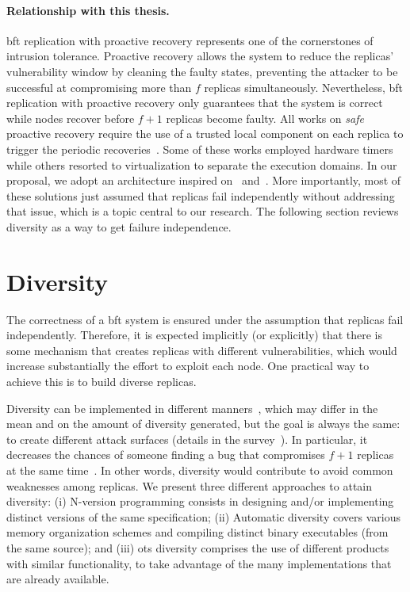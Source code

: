 \paragraph{Relationship with this thesis.} 
\gls{bft} replication with proactive recovery represents one of the cornerstones of intrusion tolerance. 
Proactive recovery allows the system to reduce the replicas' vulnerability window by cleaning the faulty states, preventing the attacker to be successful at compromising more than $f$ replicas simultaneously. 
Nevertheless, \gls{bft} replication with proactive recovery only guarantees that the system is correct while nodes recover before $f+1$ replicas become faulty. 
All works on \emph{safe} proactive recovery require the use of a trusted local component on each replica to trigger the periodic recoveries~\cite{Castro:2002,Sousa:2010,Roeder:2010,Platania:2014,Distler:2011}.
Some of these works employed hardware timers while others resorted to virtualization to separate the execution domains. 
In our proposal, we adopt an architecture inspired on~\cite{Distler:2008} and~\cite{Sousa:2010}. 
More importantly, most of these solutions just assumed that replicas fail independently without addressing that issue, which is a topic central to our research.
The following section reviews diversity as a way to get failure independence. 




\section{Diversity}
The correctness of a \gls{bft} system is ensured under the assumption that replicas fail independently.
Therefore, it is expected implicitly (or explicitly) that there is some mechanism that creates replicas with different vulnerabilities, which would increase substantially the effort to exploit each node.
One practical way to achieve this is to build diverse replicas.

Diversity can be implemented in different manners~\cite{Deswarte:1998,Larsen:2015}, which may differ in the mean and on the amount of diversity generated, but the goal is always the same: to create different attack surfaces (details in the survey~\cite{Baudry:2015}).
In particular, it decreases the chances of someone finding a bug that compromises $f+1$ replicas at the same time~\cite{Castro:2002}.
In other words, diversity would contribute to avoid common weaknesses among replicas. 
We present three different approaches to attain diversity: 
(i) N-version programming consists in designing and/or implementing distinct versions of the same specification; 
(ii) Automatic diversity covers various memory organization schemes and compiling distinct binary executables (from the same source); 
and (iii) \gls{ots} diversity comprises the use of different products with similar functionality, to take advantage of the many implementations that are already available.


